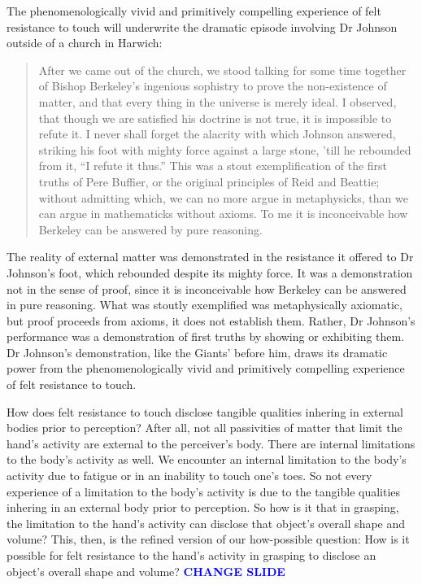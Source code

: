 \documentclass[12pt]{article}
\newcommand{\change}{\textcolor{blue}{\textbf{CHANGE SLIDE}}}
\begin{document}
The phenomenologically vivid and primitively compelling experience of felt resistance to touch will underwrite the dramatic episode involving Dr Johnson outside of a church in Harwich:
\begin{quote}
	After we came out of the church, we stood talking for some time together of Bishop Berkeley’s ingenious sophistry to prove the non-existence of matter, and that every thing in the universe is merely ideal. I observed, that though we are satisfied his doctrine is not true, it is impossible to refute it. I never shall forget the alacrity with which Johnson answered, striking his foot with mighty force against a large stone, ’till he rebounded from it, ``I refute it thus.'' This was a stout exemplification of the first truths of Pere Buffier, or the original principles of Reid and Beattie; without admitting which, we can no more argue in metaphysicks, than we can argue in mathematicks without axioms. To me it is inconceivable how Berkeley can be answered by pure reasoning.
\end{quote}
The reality of external matter was demonstrated in the resistance it offered to Dr Johnson’s foot, which rebounded despite its mighty force. It was a demonstration not in the sense of proof, since it is inconceivable how Berkeley can be answered in pure reasoning. What was stoutly exemplified was metaphysically axiomatic, but proof proceeds from axioms, it does not establish them. Rather, Dr Johnson’s performance was a demonstration of first truths by showing or exhibiting them. Dr Johnson's demonstration, like the Giants' before him, draws its dramatic power from the phenomenologically vivid and primitively compelling experience of felt resistance to touch.

How does felt resistance to touch disclose tangible qualities inhering in external bodies prior to perception? After all, not all passivities of matter that limit the hand's activity are external to the perceiver's body. There are internal limitations to the body's activity as well. We encounter an internal limitation to the body's activity due to fatigue or in an inability to touch one's toes. So not every experience of a limitation to the body's activity is due to the tangible qualities inhering in an external body prior to perception. So how is it that in grasping, the limitation to the hand's activity can disclose that object's overall shape and volume? This, then, is the refined version of our how-possible question: How is it possible for felt resistance to the hand's activity in grasping to disclose an object's overall shape and volume? \change
\end{document}
